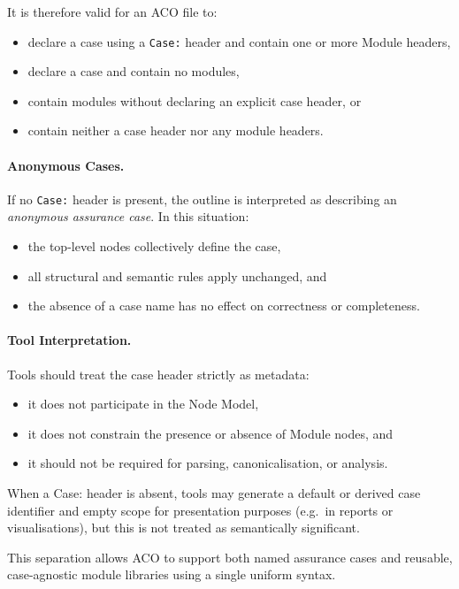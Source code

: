 \documentclass[11pt,twoside,a4paper]{article}
\begin{document}
It is therefore valid for an ACO file to:
\begin{itemize}[leftmargin=2em]
  \item declare a case using a \texttt{Case:} header and contain one or more Module headers,
  \item declare a case and contain no modules,
  \item contain modules without declaring an explicit case header, or
  \item contain neither a case header nor any module headers.
\end{itemize}

\paragraph{Anonymous Cases.}
If no \texttt{Case:} header is present, the outline is interpreted as describing an
\emph{anonymous assurance case}. In this situation:
\begin{itemize}[leftmargin=2em]
  \item the top-level nodes collectively define the case,
  \item all structural and semantic rules apply unchanged, and
  \item the absence of a case name has no effect on correctness or completeness.
\end{itemize}

\paragraph{Tool Interpretation.}
Tools should treat the case header strictly as metadata:
\begin{itemize}[leftmargin=2em]
  \item it does not participate in the Node Model,
  \item it does not constrain the presence or absence of Module nodes, and
  \item it should not be required for parsing, canonicalisation, or analysis.
\end{itemize}

When a Case: header is absent, tools may generate a default or derived case identifier and empty scope
for presentation purposes (e.g.\ in reports or visualisations), but this is not
treated as semantically significant.

This separation allows ACO to support both named assurance cases and reusable,
case-agnostic module libraries using a single uniform syntax.
\end{document}
